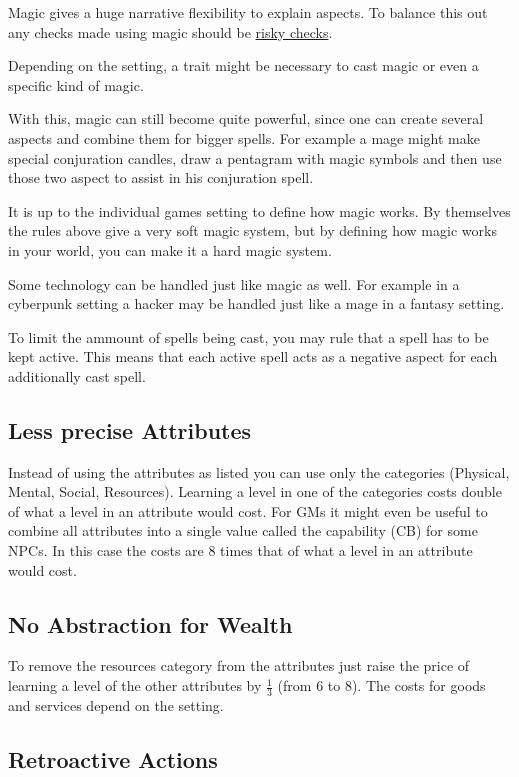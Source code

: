 \documentclass[11pt]{article}
\begin{document}
{Magic gives a huge narrative flexibility to explain aspects. To balance this out any checks made using magic should be \hyperref[sec:orgba75c45]{risky checks}.

Depending on the setting, a trait might be necessary to cast magic or even a specific kind of magic.

With this, magic can still become quite powerful, since one can create several aspects and combine them for bigger spells. For example a mage might make special conjuration candles, draw a pentagram with magic symbols and then use those two aspect to assist in his conjuration spell.

It is up to the individual games setting to define how magic works. By themselves the rules above give a very soft magic system, but by defining how magic works in your world, you can make it a hard magic system.

Some technology can be handled just like magic as well. For example in a cyberpunk setting a hacker may be handled just like a mage in a fantasy setting.

To limit the ammount of spells being cast, you may rule that a spell has to be kept active. This means that each active spell acts as a negative aspect for each additionally cast spell. 
\subsection{Less precise Attributes}
\label{sec:org454850e}
Instead of using the attributes as listed you can use only the categories (Physical, Mental, Social, Resources). Learning a level in one of the categories costs double of what a level in an attribute would cost.
For GMs it might even be useful to combine all attributes into a single value called the capability (CB) for some NPCs. In this case the costs are 8 times that of what a level in an attribute would cost.
\subsection{No Abstraction for Wealth}
\label{sec:org3bd4a5f}

To remove the resources category from the attributes just raise the price of learning a level of the other attributes by \(\frac{1}{3}\) (from 6 to 8). The costs for goods and services
depend on the setting.
\subsection{Retroactive Actions}
\label{sec:orgd8903e6}

}
\end{document}
